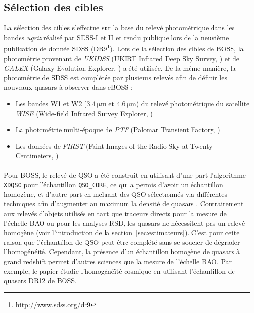 \subsection{Sélection des cibles}

La sélection des cibles s'effectue sur la base du relevé photométrique dans les bandes \emph{ugriz} réalisé par SDSS-I et II et rendu publique lors de la neuvième publication de donnée SDSS (DR9\footnote{http://www.sdss.org/dr9}).
Lors de la sélection des cibles de BOSS, la photométrie provenant de \emph{UKIDSS} (UKIRT Infrared Deep Sky Survey, \textcite{Lawrence2006}) et de \emph{GALEX} (Galaxy Evolution Explorer, \textcite{Martin2004}) a été utilisée.
De la même manière, la photométrie de SDSS est complétée par plusieurs relevés afin de définir les nouveaux quasars à observer dans eBOSS :
\begin{itemize}
\item Les bandes W1 et W2 ($\SI{3,4}{\micro\meter}$ et $\SI{4,6}{\micro\meter}$) du relevé photométrique du satellite \emph{WISE} (Wide-field Infrared Survey Explorer, \textcite{Wright2010})
\item La photométrie multi-époque de \emph{PTF} (Palomar Transient Factory, \textcite{Law2009})
\item Les données de \emph{FIRST} (Faint Images of the Radio Sky at Twenty-Centimeters, \textcite{Becker1995})
\end{itemize}


\paragraph{} Pour BOSS, le relevé de QSO a été construit en utilisant d'une part l'algorithme \texttt{XDQSO} \autocite{Bovy2010a} pour l'échantillon \texttt{QSO\_CORE}, ce qui a permis d'avoir un échantillon homogène, et d'autre part en incluant des QSO sélectionnés via différentes techniques afin d'augmenter au maximum la densité de quasars \lya{}.
Contrairement aux relevés d'objets utilisés en tant que traceurs directs pour la mesure de l'échelle BAO ou pour les analyses RSD, les quasars \lya{} ne nécessitent pas un relevé homogène (voir l'introduction de la section~\ref{sec:estimateurs}).
C'est pour cette raison que l'échantillon de QSO \lya{} peut être complété sans se soucier de dégrader l'homogénéité.
Cependant, la présence d'un échantillon homogène de quasars à grand redshift permet d'autres sciences que la mesure de l'échelle BAO.
Par exemple, le papier \textcite{Laurent2016} étudie l'homogénéïté cosmique en utilisant l'échantillon de quasars DR12 de BOSS.

